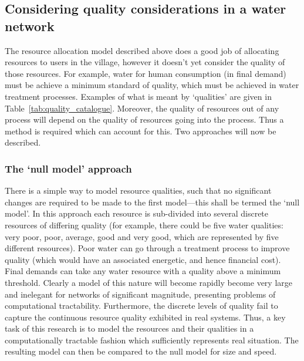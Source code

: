 \subsection{Considering quality considerations in a water network}
The resource allocation model described above does a good job of allocating resources to users in the village, however it doesn't yet consider the quality of those resources. For example, water for human consumption (in final demand) must be achieve a minimum standard of quality, which must be achieved in water treatment processes. Examples of what is meant by `qualities' are given in Table~\ref{tab:quality_catalogue}. Moreover, the quality of resources out of any process will depend on the quality of resources going into the process. Thus a method is required which can account for this. Two approaches will now be described.
 

\subsubsection*{The `null model' approach}
There is a simple way to model resource qualities, such that no significant changes are required to be made to the first model---this shall be termed the `null model'. In this approach each resource is sub-divided into several discrete resources of differing quality (for example, there could be five water qualities: very poor, poor, average, good and very good, which are represented by five different resources). Poor water can go through a treatment process to improve quality (which would have an associated energetic, and hence financial cost). Final demands can take any water resource with a quality above a minimum threshold. Clearly a model of this nature will become rapidly become very large and inelegant for networks of significant magnitude, presenting problems of computational tractability. Furthermore, the discrete levels of quality fail to capture the continuous resource quality exhibited in real systems.  Thus, a key task of this research is to model the resources and their qualities in a computationally tractable fashion which sufficiently represents real situation. The resulting model can then be compared to the null model for size and speed.

